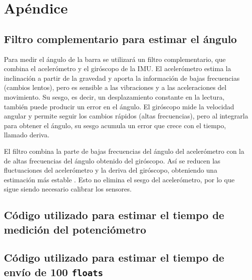 \documentclass[a4paper, twoside, 10pt, spanish]{article}
\numberwithin{table}{section}
\begin{document}
\newpage

\section{Apéndice}

\subsection{Filtro complementario para estimar el ángulo}
\label{sec:filtro_complementario}

Para medir el ángulo de la barra se utilizará un filtro complementario,
que combina el acelerómetro y el giróscopo de la IMU. El acelerómetro
estima la inclinación a partir de la gravedad y aporta la información de
bajas frecuencias (cambios lentos), pero es sensible a las vibraciones y
a las aceleraciones del movimiento. Su sesgo, es decir, un desplazamiento
constante en la lectura, también puede producir un error en el ángulo.
El giróscopo mide la velocidad angular y permite seguir los cambios
rápidos (altas frecuencias), pero al integrarla para obtener el ángulo,
su sesgo acumula un error que crece con el tiempo, llamado deriva.

El filtro combina la parte de bajas frecuencias del ángulo del
acelerómetro con la de altas frecuencias del ángulo obtenido del
giróscopo. Así se reducen las fluctuaciones del acelerómetro y la deriva
del giróscopo, obteniendo una estimación más estable
\cite{filtro_complementario}. Esto no elimina el sesgo del acelerómetro,
por lo que sigue siendo necesario calibrar los sensores.

\subsection{Código utilizado para estimar el tiempo de medición del potenciómetro} \label{sec:codigo_pote}


\subsection{Código utilizado para estimar el tiempo de envío de 100 \texttt{floats}} \label{sec:codigo_100_floats}

\label{codigo_100_floats}
\end{document}
